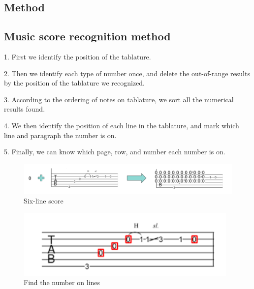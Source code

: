 \documentclass[10pt,twocolumn,letterpaper]{article}
\begin{document}
\begin{CJK}{UTF8}{bsmi}
\section{Method}

\subsection{Music score recognition method}
\begin{description}
\item 1. First we identify the position of the tablature.
\item 2. Then we identify each type of number once, and delete the out-of-range results by the position of the tablature we recognized.
\item 3. According to the ordering of notes on tablature, we sort all the numerical results found.
\item 4. We then identify the position of each line in the tablature, and mark which line and paragraph the number is on.
\item 5. Finally, we can know which page, row, and number each number is on.
\end{description}


\begin{figure}[t]
\begin{center}
   \includegraphics[width=0.8\linewidth]{method_1.png}
\end{center}
   \caption{Six-line score}
\label{fig:method_1}
\end{figure}

\begin{figure}[t]
\begin{center}
   \includegraphics[width=0.8\linewidth]{method_2.png}
\end{center}
   \caption{Find the number on lines}
\label{fig:method_2}
\end{figure}



\end{CJK}
\end{document}
